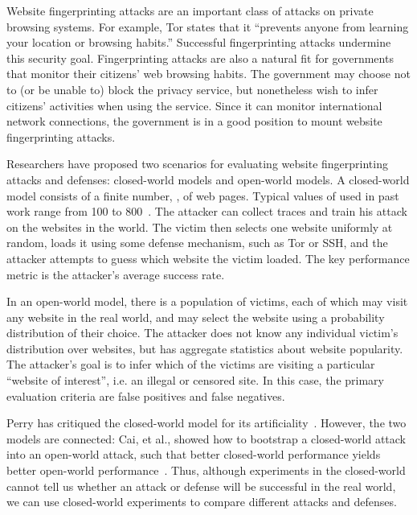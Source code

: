 \documentclass[10pt,journal]{IEEEtran}
\begin{document}
Website fingerprinting attacks are an important class of attacks on
private browsing systems.  For example, Tor states that it ``prevents
anyone from learning your location or browsing habits.''\cite{tor-website}  Successful
fingerprinting attacks undermine this security goal.  Fingerprinting
attacks are also a natural fit for governments that monitor their
citizens' web browsing habits.  The government may choose not to (or
be unable to) block the privacy service, but nonetheless wish to infer
citizens' activities when using the service.  Since it can monitor
international network connections, the government is in a good
position to mount website fingerprinting attacks.

Researchers have proposed two scenarios for evaluating website
fingerprinting attacks and defenses: closed-world models and 
open-world models.  A closed-world model consists of a finite number,
, of web pages.  Typical values of  used in past work range from
100 to 800~\cite{dyer-snp12,cai-ccs12,panchenko-wpes11}.  The attacker
can collect traces and train his attack on the websites in the world.
The victim then selects one website uniformly at random, loads it
using some defense mechanism, such as Tor or SSH, and the attacker
attempts to guess which website the victim loaded.  The key
performance metric is the attacker's average success rate.

In an open-world model, there is a population of victims, each of
which may visit any website in the real world, and may select the
website using a probability distribution of their choice. The attacker
does not know any individual victim's distribution over websites, but
has aggregate statistics about website popularity.  The attacker's
goal is to infer which of the victims are visiting a particular
``website of interest'', i.e. an illegal or censored site.  In this
case, the primary evaluation criteria are false positives and false
negatives.  

Perry has critiqued the closed-world model for its
artificiality~\cite{perry-critique}. However, the two models are
connected: Cai, et al., showed how to bootstrap a closed-world attack
into an open-world attack, such that better closed-world performance
yields better open-world performance~\cite{cai-ccs12}.  Thus, although
experiments in the closed-world cannot tell us whether an attack or
defense will be successful in the real world, we can use closed-world
experiments to compare different attacks and defenses.
\end{document}
